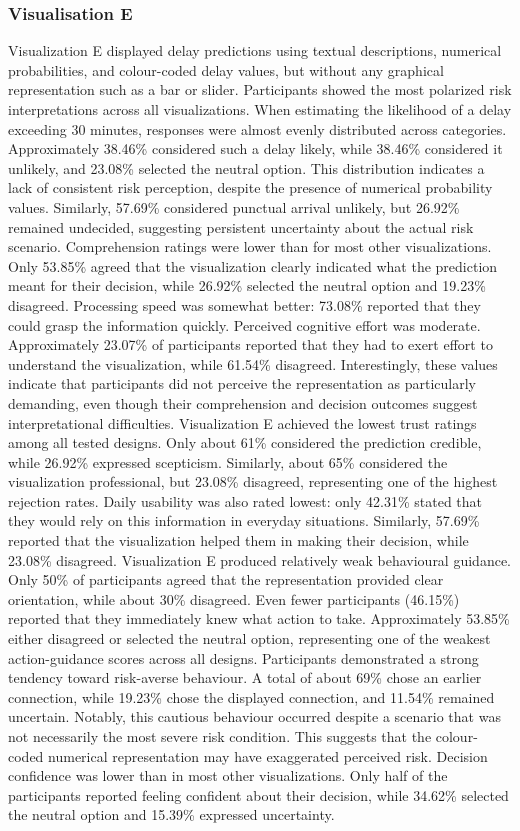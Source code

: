 \documentclass[final,journal,a4paper]{IEEEtran}
\begin{document}
\subsubsection{Visualisation E}
Visualization E displayed delay predictions using textual descriptions, numerical probabilities, and colour-coded delay values, but without any graphical representation such as a bar or slider. Participants showed the most polarized risk interpretations across all visualizations. When estimating the likelihood of a delay exceeding 30 minutes, responses were almost evenly distributed across categories. Approximately 38.46\% considered such a delay likely, while 38.46\% considered it unlikely, and 23.08\% selected the neutral option. This distribution indicates a lack of consistent risk perception, despite the presence of numerical probability values. Similarly, 57.69\% considered punctual arrival unlikely, but 26.92\% remained undecided, suggesting persistent uncertainty about the actual risk scenario. Comprehension ratings were lower than for most other visualizations. Only 53.85\% agreed that the visualization clearly indicated what the prediction meant for their decision, while 26.92\% selected the neutral option and 19.23\% disagreed. Processing speed was somewhat better: 73.08\% reported that they could grasp the information quickly. Perceived cognitive effort was moderate. Approximately 23.07\% of participants reported that they had to exert effort to understand the visualization, while 61.54\% disagreed. Interestingly, these values indicate that participants did not perceive the representation as particularly demanding, even though their comprehension and decision outcomes suggest interpretational difficulties. Visualization E achieved the lowest trust ratings among all tested designs. Only about 61\% considered the prediction credible, while 26.92\% expressed scepticism. Similarly, about 65\% considered the visualization professional, but 23.08\% disagreed, representing one of the highest rejection rates. Daily usability was also rated lowest: only 42.31\% stated that they would rely on this information in everyday situations. Similarly, 57.69\% reported that the visualization helped them in making their decision, while 23.08\% disagreed. Visualization E produced relatively weak behavioural guidance. Only 50\% of participants agreed that the representation provided clear orientation, while about 30\% disagreed. Even fewer participants (46.15\%) reported that they immediately knew what action to take. Approximately 53.85\% either disagreed or selected the neutral option, representing one of the weakest action-guidance scores across all designs. Participants demonstrated a strong tendency toward risk-averse behaviour. A total of about 69\% chose an earlier connection, while 19.23\% chose the displayed connection, and 11.54\% remained uncertain. Notably, this cautious behaviour occurred despite a scenario that was not necessarily the most severe risk condition. This suggests that the colour-coded numerical representation may have exaggerated perceived risk. Decision confidence was lower than in most other visualizations. Only half of the participants reported feeling confident about their decision, while 34.62\% selected the neutral option and 15.39\% expressed uncertainty. 
\end{document}
